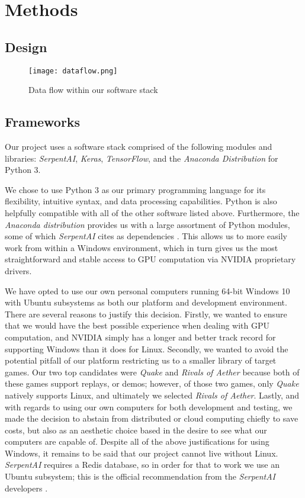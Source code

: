 \chapter{Methods}


\section{Design}

\begin{figure}
	\caption{Data flow within our software stack}
	\centering
		\texttt{[image: dataflow.png]} \\
\end{figure}



\section{Frameworks}

Our project uses a software stack comprised of the following modules and libraries: {\it SerpentAI}, {\it Keras}, {\it TensorFlow}, and the {\it Anaconda Distribution} for Python 3.

We chose to use Python 3 as our primary programming language for its flexibility, intuitive syntax, and data processing capabilities. Python is also helpfully compatible with all of the other software listed above. Furthermore, the {\it Anaconda distribution} provides us with a large assortment of Python modules, some of which {\it SerpentAI} cites as dependencies \cite{SerpentAI}. This allows us to more easily work from within a Windows environment, which in turn gives us the most straightforward and stable access to GPU computation via NVIDIA proprietary drivers.

We have opted to use our own personal computers running 64-bit Windows 10 with Ubuntu subsystems as both our platform and development environment. There are several reasons to justify this decision. Firstly, we wanted to ensure that we would have the best possible experience when dealing with GPU computation, and NVIDIA simply has a longer and better track record for supporting Windows than it does for Linux. Secondly, we wanted to avoid the potential pitfall of our platform restricting us to a smaller library of target games. Our two top candidates were {\it Quake} and {\it Rivals of Aether} because both of these games support replays, or demos; however, of those two games, only {\it Quake} natively supports Linux, and ultimately we selected {\it Rivals of Aether}. Lastly, and with regards to using our own computers for both development and testing, we made the decision to abstain from distributed or cloud computing chiefly to save costs, but also as an aesthetic choice based in the desire to see what our computers are capable of. Despite all of the above justifications for using Windows, it remains to be said that our project cannot live without Linux. {\it SerpentAI} requires a Redis database, so in order for that to work we use an Ubuntu subsystem; this is the official recommendation from the {\it SerpentAI} developers \cite{SerpentAI}.

